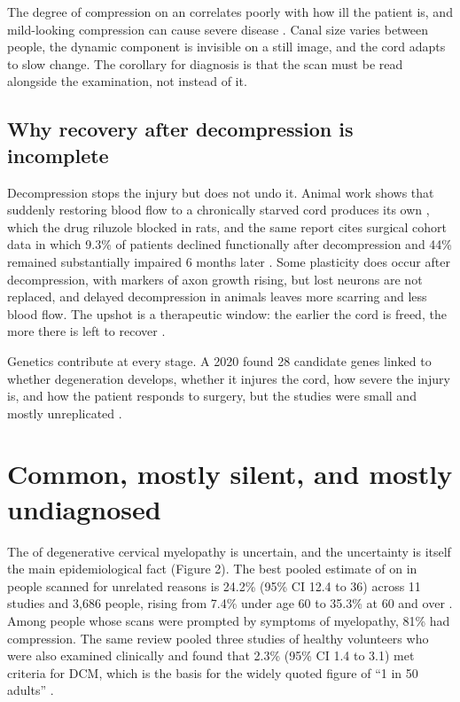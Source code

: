 \documentclass[11pt, letterpaper]{article}
\begin{document}
\begin{note}
The degree of compression on an  correlates poorly with how ill the patient is, and mild-looking compression can cause severe disease \citep{davies2018}. Canal size varies between people, the dynamic component is invisible on a still image, and the cord adapts to slow change. The corollary for diagnosis is that the scan must be read alongside the examination, not instead of it.
\end{note}

\subsection*{Why recovery after decompression is incomplete}

Decompression stops the injury but does not undo it. Animal work shows that suddenly restoring blood flow to a chronically starved cord produces its own , which the drug \gls{riluzole} blocked in rats, and the same report cites surgical cohort data in which 9.3\% of patients declined functionally after decompression and 44\% remained substantially impaired 6 months later \citep{karadimas2015}. Some plasticity does occur after decompression, with markers of axon growth rising, but lost neurons are not replaced, and delayed decompression in animals leaves more scarring and less blood flow. The upshot is a therapeutic window: the earlier the cord is freed, the more there is left to recover \citep{akter2020}.

Genetics contribute at every stage. A 2020  found 28 candidate genes linked to whether degeneration develops, whether it injures the cord, how severe the injury is, and how the patient responds to surgery, but the studies were small and mostly unreplicated \citep{pope2020genetics}.

\section{Common, mostly silent, and mostly undiagnosed}

The  of degenerative cervical myelopathy is uncertain, and the uncertainty is itself the main epidemiological fact (Figure 2). The best pooled estimate of  on  in people scanned for unrelated reasons is 24.2\% (95\% CI 12.4 to 36) across 11 studies and 3,686 people, rising from 7.4\% under age 60 to 35.3\% at 60 and over \citep{smith2021}. Among people whose scans were prompted by symptoms of myelopathy, 81\% had compression. The same review pooled three studies of healthy volunteers who were also examined clinically and found that 2.3\% (95\% CI 1.4 to 3.1) met criteria for DCM, which is the basis for the widely quoted figure of “1 in 50 adults” \citep{smith2021,davies2024cos}.
\end{document}
